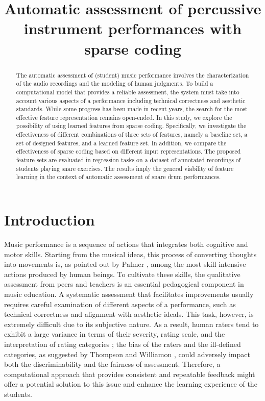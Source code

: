 \documentclass{article}
\title{Automatic assessment of percussive instrument performances with sparse coding}
\begin{document}
%
\maketitle
%
\begin{abstract}
The automatic assessment of (student) music performance involves the characterization of the audio recordings and the modeling of human judgments. To build a computational model that provides a reliable assessment, the system must take into account various aspects of a performance including technical correctness and aesthetic standards. While some progress has been made in recent years, the search for the most effective feature representation remains open-ended. In this study, we explore the possibility of using learned features from sparse coding. Specifically, we investigate the effectiveness of different combinations of three sets of features, namely a baseline set, a set of designed features, and a learned feature set. In addition, we compare the effectiveness of sparse coding based on different input representations. The proposed feature sets are evaluated in regression tasks on a dataset of annotated recordings of students playing snare exercises. The results imply the general viability of feature learning in the context of automatic assessment of snare drum performances.   
\end{abstract}
%
\section{Introduction}
Music performance is a sequence of actions that integrates both cognitive and motor skills. Starting from the musical ideas, this process of converting thoughts into movements is, as pointed out by Palmer \cite{Palmer1997}, among the most skill intensive actions produced by human beings. To cultivate these skills, the qualitative assessment from  peers and teachers is an essential pedagogical component in music education. A systematic assessment that facilitates improvements usually requires careful examination of different aspects of a performance, such as technical correctness and alignment with aesthetic ideals. This task, however, is extremely difficult due to its subjective nature. As a result, human raters tend to exhibit a large variance in terms of their severity, rating scale, and the interpretation of rating categories \cite{Wesolowski2016}; the bias of the raters and the ill-defined categories, as suggested by Thompson and Williamon \cite{Thompson2003}, could adversely impact both the discriminability and the fairness of assessment. Therefore, a computational approach that provides consistent and repeatable feedback might offer a potential solution to this issue and enhance the learning experience of the students. 
\end{document}

